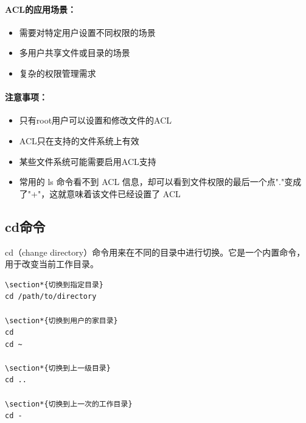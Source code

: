 \documentclass[12pt,UTF8]{ctexbook}
\begin{document}
\paragraph{ACL的应用场景：}
\begin{itemize}
    \item 需要对特定用户设置不同权限的场景
    \item 多用户共享文件或目录的场景
    \item 复杂的权限管理需求
\end{itemize}

\paragraph{注意事项：}
\begin{itemize}
    \item 只有root用户可以设置和修改文件的ACL
    \item ACL只在支持的文件系统上有效
    \item 某些文件系统可能需要启用ACL支持
    \item 常用的 ls 命令看不到 ACL 信息，却可以看到文件权限的最后一个点"."变成了"+"，这就意味着该文件已经设置了 ACL
\end{itemize}

\subsection{cd命令}
cd（change directory）命令用来在不同的目录中进行切换。它是一个内置命令，用于改变当前工作目录。

\begin{verbatim}
\section*{切换到指定目录}
cd /path/to/directory

\section*{切换到用户的家目录}
cd
cd ~

\section*{切换到上一级目录}
cd ..

\section*{切换到上一次的工作目录}
cd -
\end{verbatim}
\end{document}

